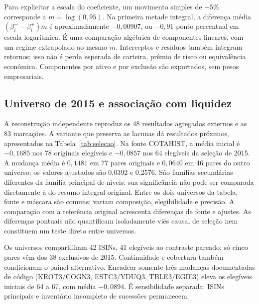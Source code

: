 Para explicitar a escala do coeficiente, um movimento simples de $-5\%$
corresponde a $m=\log(0,95)$. Na primeira metade integral,
a diferença média $(\beta^-_i-\beta^+_i)m $ é aproximadamente $-0,00907$,
ou $-0,91$ ponto percentual em escala logarítmica. É uma comparação
algébrica de componentes lineares, com um regime extrapolado ao mesmo $m $.
Interceptos e resíduos também integram retornos; isso não é perda esperada
de carteira, prêmio de risco ou equivalência econômica. Componentes
por ativo e por exclusão são exportados, sem pesos empresariais.


\subsection{Universo de 2015 e associação com liquidez}
A reconstrução independente reproduz os 48 resultados agregados externos
e as 83 marcações. A variante que preserva as lacunas dá resultados
próximos, apresentados na Tabela~\ref{tab:selecao}.
Na fonte COTAHIST, a média inicial é $-0,1685$ nos 78 originais elegíveis
e $-0,0857$ nos 64 elegíveis da seleção de 2015. A mudança média é
$0,1481$ em 77 pares originais e $0,0640$ em 46 pares do outro universo;
os valores ajustados são 0,0392 e 0,2576. São famílias secundárias
diferentes da família principal de níveis: sua significância não pode ser comparada diretamente
à do resumo integral original. Entre os dois universos da tabela,
fonte e máscara são comuns; variam composição, elegibilidade e precisão.
A comparação com a referência original acrescenta diferenças de fonte
e ajustes. As diferenças pontuais não quantificam isoladamente viés
causal de seleção nem constituem um teste direto entre universos.

\begin{table}[!htbp]\centering\small
\caption{COTAHIST com lacunas preservadas, bloco 21. $p^*$: Holm 4 para
nível inicial/mudança e Holm 2 para década; família distinta dos níveis da referência original.
A máscara de eventos permanece heurística.}
\label{tab:selecao}
\end{table}

Os universos compartilham 42 ISINs, 41 elegíveis ao contraste pareado;
só cinco pares vêm dos 38 exclusivos de 2015. Continuidade e cobertura
também condicionam o painel alternativo. Encadear somente três mudanças
documentadas de código (KROT3/COGN3, ESTC3/YDUQ3, TBLE3/EGIE3)
\cite{cogna2019,yduqs2019,engie2016} eleva os elegíveis iniciais de 64
a 67, com média $-0,0894$. É sensibilidade separada: ISINs principais
e inventário incompleto de sucessões permanecem.

